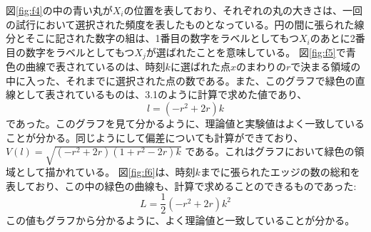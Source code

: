 図\ref{fig:f4}の中の青い丸が$X_{i}$の位置を表しており、それぞれの丸の大きさは、一回の試行において選択された頻度を表したものとなっている。円の間に張られた線分とそこに記された数字の組は、1番目の数字をラベルとしてもつ$X_{i}$のあとに2番目の数字をラベルとしてもつ$X_{j}$が選ばれたことを意味している。
図\ref{fig:f5}で青色の曲線で表されているのは、時刻$k$に選ばれた点$x$のまわりの$r$で決まる領域の中に入った、それまでに選択された点の数である。また、このグラフで緑色の直線として表されているものは、3.1のように計算で求めた値であり、
\[l = (-r^{2} + 2r)k\]
であった。このグラフを見て分かるように、理論値と実験値はよく一致していることが分かる。同じようにして偏差についても計算ができており、
$V(l) = \sqrt{(-r^{2} + 2r)(1+r^{2}-2r)k}$
である。これはグラフにおいて緑色の領域として描かれている。
図\ref{fig:f6}は、時刻$k$までに張られたエッジの数の総和を表しており、この中の緑色の曲線も、計算で求めることのできるものであった:
\[L = \frac{1}{2}(-r^{2} + 2r)k^{2}\]
この値もグラフから分かるように、よく理論値と一致していることが分かる。

